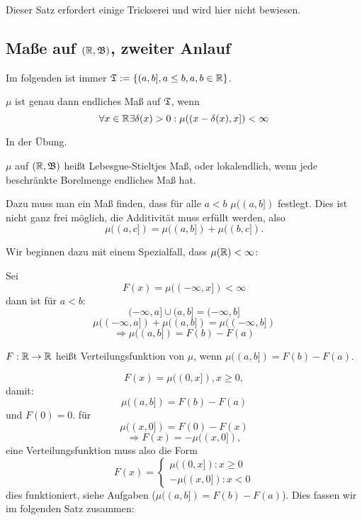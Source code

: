 			\begin{bew}
				Dieser Satz erfordert einige Trickserei und wird hier nicht bewiesen.
			\end{bew}
			
		\subsection{Maße auf $(\mathbb{R}, \mathfrak{B})$, zweiter Anlauf}
			Im folgenden ist immer $\mathfrak{T}:=\{(a,b], a\le b, a,b\in\mathbb{R}\}$.
			
			\begin{satz}
				$\mu$ ist genau dann endliches Maß auf $\mathfrak{T}$, wenn
				\[ \forall x\in\mathbb{R}\exists\delta(x)>0: \mu((x-\delta(x),x])<\infty \]
			\end{satz}	
			
			\begin{bew}
				In der Übung.
			\end{bew}
			
			\begin{defi}
				$\mu$ auf $(\mathbb{R}, \mathfrak{B})$ heißt Lebesgue-Stieltjes Maß, oder lokalendlich, wenn jede beschränkte Borelmenge endliches Maß hat. 
			\end{defi}
			
			\begin{bem}
				Dazu muss man ein Maß finden, dass für alle $a<b$ $\mu((a,b])$ festlegt. Dies ist nicht ganz frei möglich, die Additivität muss erfüllt werden, also 
				\[ \mu((a,c])=\mu((a,b])+\mu((b,c]). \]
				
				Wir beginnen dazu mit einem Spezialfall, dass $\mu(\mathbb{R})<\infty$:
			\end{bem}
			
			\begin{bsp}
				Sei
				\[ F(x)=\mu((-\infty,x])<\infty \]
				dann ist für $a<b$:
				\[ (-\infty,a]\cup (a,b]=(-\infty,b] \]
				\[ \mu((-\infty,a])+\mu((a,b])=\mu((-\infty,b]) \]
				\[ \Rightarrow \mu((a,b])=F(b)-F(a) \]
			\end{bsp} 
			
			\begin{defi}
				$F:\mathbb{R}\to\mathbb{R}$ heißt Verteilungsfunktion von $\mu$, wenn $\mu((a,b])=F(b)-F(a)$. 
			\end{defi}
			
			\begin{bem}
				\[ F(x)=\mu((0,x]), x\ge 0, \]
				damit:
				\[ \mu((a,b])=F(b)-F(a) \]
				und $F(0)=0$. \newline
				für
				\[ \mu((x,0])=F(0)-F(x) \]
				\[ \Rightarrow F(x)=-\mu((x,0]), \]
				eine Verteilungsfunktion muss also die Form
				\[ F(x)=\left\{\begin{array}{l}
				\mu((0,x]): x\ge 0\\
				-\mu((x,0]): x<0
				\end{array}\right. \]
				dies funktioniert, siehe Aufgaben (\zz $\mu((a,b])=F(b)-F(a)$). Dies fassen wir im folgenden Satz zusammen:
			\end{bem}
			
